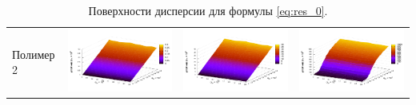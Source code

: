 \documentclass[12pt,a4paper]{article}
\begin{document}
\begin{table}[h]
\begin{tabular}{l | c c c}
	\begin{rotate}{90}Полимер 2\end{rotate} &	\includegraphics[scale=0.4]{figs/even/p2.txt_coeff0.dat.pdf} & \includegraphics[scale=0.4]{figs/even/p2.txt_coeff1.dat.pdf} & \includegraphics[scale=0.4]{figs/even/p2.txt_coeff2.dat.pdf}
  \end{tabular}
  \caption{Поверхности дисперсии для формулы \eqref{eq:res_0}.}
  \label{tabl:res_even}
\end{table}
\end{document}
